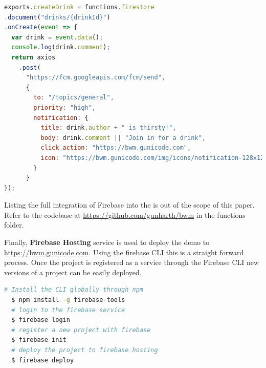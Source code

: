 \begin{lstlisting}[language=JavaScript, caption=Firebase Functions calling the messaging service when a new post is created in the Firestore database(functions/index.js), label=lst:firebase-function]
exports.createDrink = functions.firestore
.document("drinks/{drinkId}")
.onCreate(event => {
  var drink = event.data();
  console.log(drink.comment);
  return axios
    .post(
      "https://fcm.googleapis.com/fcm/send",
      {
        to: "/topics/general",
        priority: "high",
        notification: {
          title: drink.author + " is thirsty!",
          body: drink.comment || "Join in for a drink",
          click_action: "https://bwm.gunicode.com",
          icon: "https://bwm.gunicode.com/img/icons/notification-128x128.png"
        }
      }
});
\end{lstlisting}

Listing the full integration of Firebase into the is out of the scope of this paper. Refer to the codebase at \url{https://github.com/gunharth/bwm} in the functions folder.

Finally, \textbf{Firebase Hosting} service is used to deploy the demo to \url{https://bwm.gunicode.com}. Using the firebase CLI this is a straight forward process. Once the project is registered as a service through the Firebase CLI new versions of a project can be easily deployed.

\begin{lstlisting}[language=bash, caption=Firebase CLI commands, label=lst:vue-cli]
  # Install the CLI globally through npm
  $ npm install -g firebase-tools
  # login to the firebase service
  $ firebase login
  # register a new project with firebase
  $ firebase init
  # deploy the project to firebase hosting
  $ firebase deploy
\end{lstlisting}
